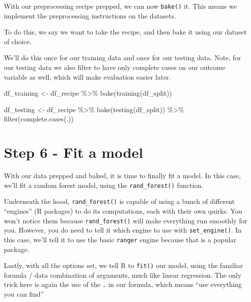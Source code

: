 \documentclass[
]{book}
\newenvironment{Shaded}{\begin{snugshade}}{\end{snugshade}}
\newcommand{\FunctionTok}[1]{\textcolor[rgb]{0.00,0.00,0.00}{#1}}
\newcommand{\NormalTok}[1]{#1}
\newcommand{\OtherTok}[1]{\textcolor[rgb]{0.56,0.35,0.01}{#1}}
\newcommand{\SpecialCharTok}[1]{\textcolor[rgb]{0.00,0.00,0.00}{#1}}
\begin{document}
With our preprocessing recipe prepped, we can now \texttt{bake()} it. This means we implement the preprocessing instructions on the datasets.

To do this, we say we want to take the recipe, and then bake it using our dataset of choice.

We'll do this once for our training data and once for our testing data. Note, for our testing data we also filter to have only complete cases on our outcome variable as well, which will make evaluation easier later.

\begin{Shaded}
\begin{Highlighting}[]
\NormalTok{df\_training }\OtherTok{\textless{}{-}}\NormalTok{ df\_recipe }\SpecialCharTok{\%\textgreater{}\%} 
  \FunctionTok{bake}\NormalTok{(}\FunctionTok{training}\NormalTok{(df\_split))}

\NormalTok{df\_testing }\OtherTok{\textless{}{-}}\NormalTok{ df\_recipe }\SpecialCharTok{\%\textgreater{}\%} 
  \FunctionTok{bake}\NormalTok{(}\FunctionTok{testing}\NormalTok{(df\_split)) }\SpecialCharTok{\%\textgreater{}\%} 
  \FunctionTok{filter}\NormalTok{(}\FunctionTok{complete.cases}\NormalTok{(.))}
\end{Highlighting}
\end{Shaded}

\hypertarget{step-6---fit-a-model}{%
\section{Step 6 - Fit a model}\label{step-6---fit-a-model}}

With our data prepped and baked, it is time to finally fit a model. In this case, we'll fit a random forest model, using the \texttt{rand\_forest()} function.

Underneath the hood, \texttt{rand\_forest()} is capable of using a bunch of different ``engines'' (R packages) to do its computations, each with their own quirks. You won't notice them because \texttt{rand\_forest()} will make everything run smoothly for you. However, you do need to tell it which engine to use with \texttt{set\_engine()}. In this case, we'll tell it to use the basic \texttt{\textquotesingle{}ranger\textquotesingle{}} engine because that is a popular package.

Lastly, with all the options set, we tell R to \texttt{fit()} our model, using the familiar formula / data combination of arguments, much like linear regression. The only trick here is again the use of the \texttt{.} in our formula, which means ``use everything you can find''
\end{document}
